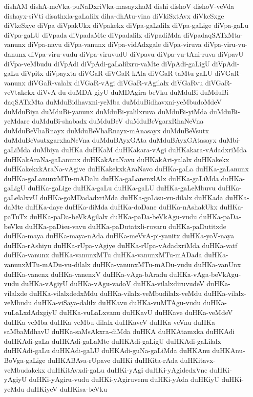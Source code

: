 {dishAM
dishA-meVka-puNaDxriVka-masayxhaM
dishi
dishoV
dishoV-veVda
dishayx-siVti
disathxla-gaLalilx
diha-dhAtu-vina
diVkiSxtAvx
diVkeSxge
diVkeSxye
diVpa
diVpakUkx
diVpakekx
diVpa-gaLalilx
diVpa-gaLige
diVpa-gaLu
diVpa-gaLU
diVpada
diVpadaMte
diVpadalilx
diVpadiMda
diVpadaqSATxMta-vanunx
diVpa-navu
diVpa-vanunx
diVpa-vidAdxgale
diVpa-viruva
diVpa-viru-vu-danunx
diVpa-viru-vudu
diVpa-viruvudU
diVpavu
diVpa-vu-tAni-ruva
diVpavU
diVpa-veMbudu
diVpAdi
diVpAdi-gaLalilxru-vaMte
diVpAdi-gaLigU
diVpAdi-gaLu
diVpitx
diVpayxta
diVGaR
diVGaR-kAla
diVGaR-taMtu-gaLU
diVGaR-vanunx
diVGaR-valalx
diVGaR-vAgi
diVGaR-vAgilalx
diVGaRvu
diVGaR-veVtakekx
diVvA
du
duMDA-giyU
duMDAgira-beVku
duMduBi
duMduBi-daqSATxMta
duMduBidhavxni-yeMba
duMduBidhavxni-yeMbudoMdeV
duMduBiya
duMduBi-yanunx
duMduBi-yalilxruva
duMduBi-yiMda
duMduBi-yeMdare
duMduBi-shabadx
duMduBeV
duMduBeVgarxRhaNeVna
duMduBeVhaRnayx
duMduBeVhaRnayx-mAnasayx
duMduBeVsutx
duMduBeVsutxgarxhaNeVna
duMduBAyxGAta
duMduBAyxGAtasayx
duMbi-gaLiMda
duMbiya
duHKa
duHKaM
duHKakara-vAgi
duHKakara-vAdadxriMda
duHKakAraNa-gaLanunx
duHKakAraNavu
duHKakAri-yalalx
duHKakekx
duHKakekxkAraNa-vAgive
duHKakekxkAraNavo
duHKa-gaLa
duHKa-gaLanunx
duHKa-gaLanunxMTu-mADalu
duHKa-gaLanenxlAlx
duHKa-gaLiMda
duHKa-gaLigU
duHKa-gaLige
duHKa-gaLu
duHKa-gaLU
duHKa-gaLeMbuvu
duHKa-gaLelalxvU
duHKa-goMDadadxriMda
duHKa-goLisu-vu-dilalx
duHKada
duHKa-daMte
duHKa-daye
duHKa-diMda
duHKa-doDane
duHKa-nAshakUkx
duHKa-paTuTx
duHKa-paDa-beVkAgilalx
duHKa-paDa-beVkAgu-vudu
duHKa-paDa-beVku
duHKa-paDisu-vavu
duHKa-paDutatxli-ruvaru
duHKa-paDutitxde
duHKa-maya
duHKa-maya-nAda
duHKa-meVvA-pi-yanitx
duHKa-yoV-naya
duHKa-rAshiyu
duHKa-rUpa-vAgiye
duHKa-rUpa-vAdadxriMda
duHKa-vatf
duHKa-vanunx
duHKa-vanunxMTu
duHKa-vanunxMTu-mADada
duHKa-vanunxMTu-mADu-vu-dilalx
duHKa-vanunxMTu-mADu-vudu
duHKa-vanUnx
duHKa-vanenx
duHKa-vanenxV
duHKa-vAga-bAradu
duHKa-vAga-beVkAgu-vudu
duHKa-vAgiyU
duHKa-vAgu-vadoV
duHKa-vilalxdiruvudeV
duHKa-vilalxde
duHKa-vilalxdedxMdu
duHKa-vilalx-veMbudilalx-veMdu
duHKa-vilalx-veMbudu
duHKa-viSaya-dalilx
duHKavu
duHKa-vuMTAgu-vudu
duHKa-vuLaLxdAdxgiyU
duHKa-vuLaLxvanu
duHKavU
duHKave
duHKa-veMdeV
duHKa-veMba
duHKa-veMbu-dilalx
duHKaveV
duHKa-veVnu
duHKa-saMbaMdhavU
duHKa-saMsAkxra-diMda
duHKA
duHKAtamxka
duHKAdi
duHKAdi-gaLa
duHKAdi-gaLaMte
duHKAdi-gaLigU
duHKAdi-gaLilalx
duHKAdi-gaLu
duHKAdi-gaLU
duHKAdi-guNa-gaLiMda
duHKAnu
duHKAnu-BoVga-gaLige
duHKABAva-rUpave
duHKi
duHKita-rAda
duHKitavx-veMbudakekx
duHKitAvxdi-gaLu
duHKi-yAgi
duHKi-yAgidedxVne
duHKi-yAgiyU
duHKi-yAgiru-vudu
duHKi-yAgiruvenu
duHKi-yAda
duHKiyU
duHKi-yeMdu
duHKiyeV
duHKisa-beVku
}
